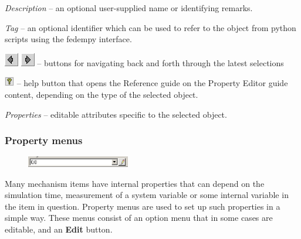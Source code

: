 \begin{bulletlist}
\item{\sl Description} --
  an optional user-supplied name or identifying remarks.
\item{\sl Tag} --
  an optional identifier which can be used to refer to the object from
  python scripts using the fedempy interface.
\item\includegraphics[scale=0.5]{Figures/Icons/selectbackward}
  \includegraphics[scale=0.5]{Figures/Icons/selectforward} --
  buttons for navigating back and forth through the latest selections
\item\includegraphics[scale=2.0]{Figures/icons/help} --
  help button that opens the Reference guide on the Property Editor guide
  content, depending on the type of the selected object.
\item{\sl Properties} --
  editable attributes specific to the selected object.
\end{bulletlist}




\subsubsection{Property menus}

\begin{figure}
  \includegraphics[width=0.4\textwidth]{Figures/2-PropertyValueMenu}
\end{figure}

Many mechanism items have internal properties that can depend on the
simulation time, measurement of a system variable or some internal
variable in the item in question. Property menus are used to
set up such properties in a simple way. These menus consist of
an option menu that in some cases are editable, and an \textbf{Edit} button.


